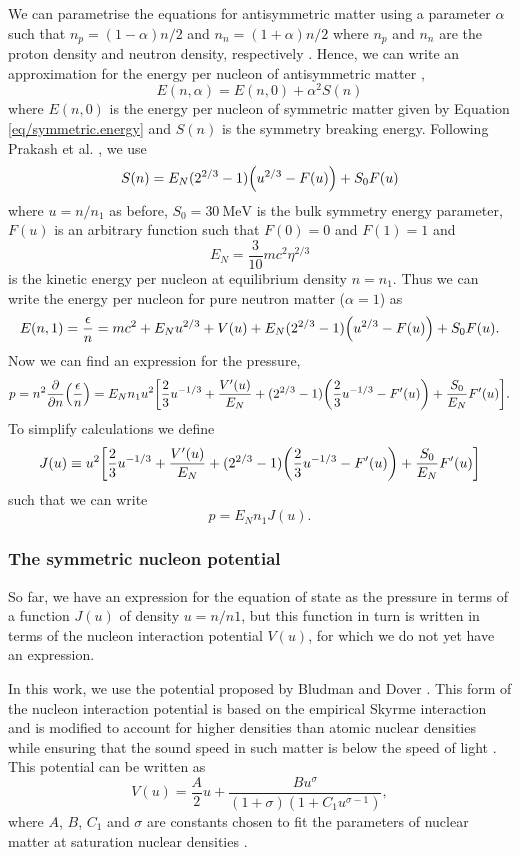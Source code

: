 \documentclass[draft,11pt]{article}
\theoremstyle{definition}
\theoremstyle{remark}
\begin{document}
            We can parametrise the equations for antisymmetric matter using a parameter $\alpha$ such that $n_{p}=(1-\alpha)n/2$ and $n_{n}=(1+\alpha)n/2$ where $n_{p}$ and $n_{n}$ are the proton density and neutron density, respectively \parencite{silbar.reddy.2004/neutron.stars}. Hence, we can write an approximation for the energy per nucleon of antisymmetric matter \parencite{prakash.ainsworth.lattimer.1988/eos}, \begin{equation}\label{eq/antisymmetric.energy}E(n,\alpha)=E(n,0)+\alpha^{2}S(n)\end{equation} where $E(n,0)$ is the energy per nucleon of symmetric matter given by Equation \ref{eq/symmetric.energy} and $S(n)$ is the symmetry breaking energy. Following Prakash et al. \cite{prakash.ainsworth.lattimer.1988/eos}, we use \begin{equation}\label{eq/symmetry.breaking}S(n)=E_{N}(2^{2/3}-1)\qty(u^{2/3}-F(u))+S_{0}F(u)\end{equation} where $u=n/n_{1}$ as before, $S_{0}=\SI{30}{\mega\electronvolt}$ \parencite{prakash.lattimer.2001/ns.structure.eos} is the bulk symmetry energy parameter, $F(u)$ is an arbitrary function such that $F(0)=0$ and $F(1)=1$ and \[E_{N}=\frac{3}{10}mc^{2}\eta^{2/3}\] is the kinetic energy per nucleon at equilibrium density $n=n_{1}$. Thus we can write the energy per nucleon for pure neutron matter ($\alpha=1$) as \[E(n,1)=\frac{\epsilon}{n}=mc^{2}+E_{N}u^{2/3}+V(u)+E_{N}(2^{2/3}-1)\qty(u^{2/3}-F(u))+S_{0}F(u).\] Now we can find an expression for the pressure, \[p=n^{2}\pdv{n}\qty(\frac{\epsilon}{n})=E_{N}n_{1}u^{2}\qty[\frac{2}{3}u^{-1/3}+\frac{V'(u)}{E_{N}}+(2^{2/3}-1)\qty(\frac{2}{3}u^{-1/3}-F'(u))+\frac{S_{0}}{E_{N}}F'(u)].\] To simplify calculations we define \[J(u)\equiv u^{2}\qty[\frac{2}{3}u^{-1/3}+\frac{V'(u)}{E_{N}}+(2^{2/3}-1)\qty(\frac{2}{3}u^{-1/3}-F'(u))+\frac{S_{0}}{E_{N}}F'(u)]\] such that we can write \[p=E_{N}n_{1}J(u).\]
            
            \subsubsection{The symmetric nucleon potential}
                So far, we have an expression for the equation of state as the pressure in terms of a function $J(u)$ of density $u=n/n1$, but this function in turn is written in terms of the nucleon interaction potential $V(u)$, for which we do not yet have an expression.
                
                In this work, we use the potential proposed by Bludman and Dover \cite{bludman.dover.1980/extrapolation.skyrme.eos}. This form of the nucleon interaction potential is based on the empirical Skyrme interaction and is modified to account for higher densities than atomic nuclear densities while ensuring that the sound speed in such matter is below the speed of light \cite{bludman.dover.1980/extrapolation.skyrme.eos}. This potential can be written as \parencite{silbar.reddy.2004/neutron.stars} \[V(u)=\frac{A}{2}u+\frac{Bu^{\sigma}}{(1+\sigma)(1+C_{1}u^{\sigma-1})},\] where $A$, $B$, $C_{1}$ and $\sigma$ are constants chosen to fit the parameters of nuclear matter at saturation nuclear densities \parencite{bludman.dover.1980/extrapolation.skyrme.eos}.
                
\end{document}
